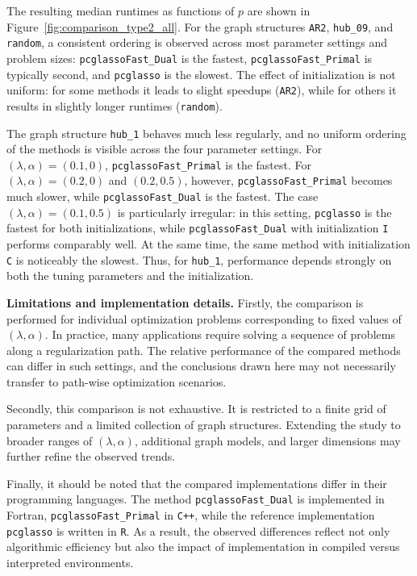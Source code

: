\documentclass[12pt]{amsart}
\numberwithin{equation}{section}
\numberwithin{equation}{section}
\theoremstyle{plain}
\theoremstyle{definition}
\begin{document}
The resulting median runtimes as functions of $p$ are shown in Figure~\ref{fig:comparison_type2_all}.
For the graph structures \texttt{AR2}, \texttt{hub\_09}, and \texttt{random}, a consistent ordering is observed across most parameter settings and problem sizes:
\texttt{pcglassoFast\_Dual} is the fastest, \texttt{pcglassoFast\_\allowbreak Primal} is typically second, and \texttt{pcglasso} is the slowest.
The effect of initialization is not uniform: for some methods it leads to slight speedups (\texttt{AR2}), while for others it results in slightly longer runtimes (\texttt{random}).

The graph structure \texttt{hub\_1} behaves much less regularly, and no uniform ordering of the methods is visible across the four parameter settings.
For $(\lambda,\alpha)=(0.1,0)$, \texttt{pcglassoFast\_Primal} is the fastest.
For $(\lambda,\alpha)=(0.2,0)$ and $(0.2,0.5)$, however, \texttt{pcglassoFast\_Primal} becomes much slower, while \texttt{pcglassoFast\_Dual} is the fastest.
The case $(\lambda,\alpha)=(0.1,0.5)$ is particularly irregular: in this setting, \texttt{pcglasso} is the fastest for both initializations, while \texttt{pcglassoFast\_Dual} with initialization \texttt{I} performs comparably well.
At the same time, the same method with initialization \texttt{C} is noticeably the slowest.
Thus, for \texttt{hub\_1}, performance depends strongly on both the tuning parameters and the initialization.

\textbf{Limitations and implementation details.}
Firstly, the comparison is performed for individual optimization problems corresponding to fixed values of $(\lambda,\alpha)$.
In practice, many applications require solving a sequence of problems along a regularization path.
The relative performance of the compared methods can differ in such settings, and the conclusions drawn here may not necessarily transfer to path-wise optimization scenarios.

Secondly, this comparison is not exhaustive.
It is restricted to a finite grid of parameters and a limited collection of graph structures.
Extending the study to broader ranges of $(\lambda,\alpha)$, additional graph models, and larger dimensions may further refine the observed trends.

Finally, it should be noted that the compared implementations differ in their programming languages.
The method \texttt{pcglassoFast\_Dual} is implemented in Fortran, \texttt{pcglassoFast\_Primal} in \texttt{C++}, while the reference implementation \texttt{pcglasso} is written in \texttt{R}.
As a result, the observed differences reflect not only algorithmic efficiency but also the impact of implementation in compiled versus interpreted environments.
\end{document}
